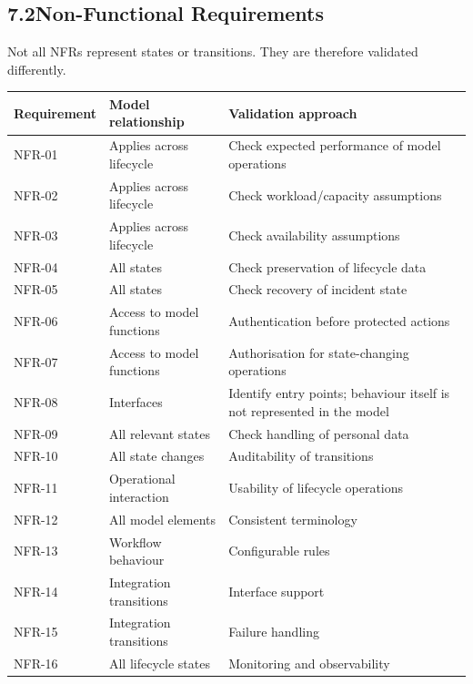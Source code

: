 \documentclass[11pt,a4paper]{article}
\begin{document}
\subsection*{7.2\enspace Non-Functional Requirements}

Not all NFRs represent states or transitions. They are therefore validated differently.

\begin{center}
\small
\begin{tabularx}{\textwidth}{@{} l X X @{}}
\toprule
\textbf{Requirement} & \textbf{Model relationship} & \textbf{Validation approach} \\
\midrule
NFR-01 & Applies across lifecycle & Check expected performance of model operations \\
NFR-02 & Applies across lifecycle & Check workload/capacity assumptions \\
NFR-03 & Applies across lifecycle & Check availability assumptions \\
NFR-04 & All states & Check preservation of lifecycle data \\
NFR-05 & All states & Check recovery of incident state \\
NFR-06 & Access to model functions & Authentication before protected actions \\
NFR-07 & Access to model functions & Authorisation for state-changing operations \\
NFR-08 & Interfaces & Identify entry points; behaviour itself is not represented in the model \\
NFR-09 & All relevant states & Check handling of personal data \\
NFR-10 & All state changes & Auditability of transitions \\
NFR-11 & Operational interaction & Usability of lifecycle operations \\
NFR-12 & All model elements & Consistent terminology \\
NFR-13 & Workflow behaviour & Configurable rules \\
NFR-14 & Integration transitions & Interface support \\
NFR-15 & Integration transitions & Failure handling \\
NFR-16 & All lifecycle states & Monitoring and observability \\
\bottomrule
\end{tabularx}
\end{center}

\end{document}

